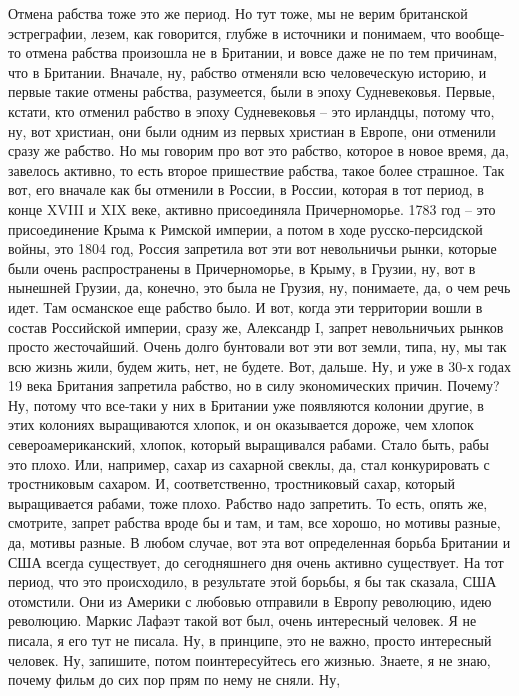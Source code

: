 Отмена рабства тоже это же период. Но тут тоже, мы не верим британской
эстреграфии, лезем, как говорится, глубже в источники и понимаем, что вообще-то
отмена рабства произошла не в Британии, и вовсе даже не по тем причинам, что в
Британии. Вначале, ну, рабство отменяли всю человеческую историю, и первые такие
отмены рабства, разумеется, были в эпоху Судневековья. Первые, кстати, кто
отменил рабство в эпоху Судневековья – это ирландцы, потому что, ну, вот
христиан, они были одним из первых христиан в Европе, они отменили сразу же
рабство. Но мы говорим про вот это рабство, которое в новое время, да, завелось
активно, то есть второе пришествие рабства, такое более страшное. Так вот, его
вначале как бы отменили в России, в России, которая в тот период, в конце XVIII
и XIX веке, активно присоединяла Причерноморье. 1783 год – это присоединение
Крыма к Римской империи, а потом в ходе русско-персидской войны, это 1804 год,
Россия запретила вот эти вот невольничьи рынки, которые были очень
распространены в Причерноморье, в Крыму, в Грузии, ну, вот в нынешней Грузии,
да, конечно, это была не Грузия, ну, понимаете, да, о чем речь идет. Там
османское еще рабство было. И вот, когда эти территории вошли в состав
Российской империи, сразу же, Александр I, запрет невольничьих рынков просто
жесточайший. Очень долго бунтовали вот эти вот земли, типа, ну, мы так всю жизнь
жили, будем жить, нет, не будете. Вот, дальше. Ну, и уже в 30-х годах 19 века
Британия запретила рабство, но в силу экономических причин. Почему? Ну, потому
что все-таки у них в Британии уже появляются колонии другие, в этих колониях
выращиваются хлопок, и он оказывается дороже, чем хлопок североамериканский,
хлопок, который выращивался рабами. Стало быть, рабы это плохо. Или, например,
сахар из сахарной свеклы, да, стал конкурировать с тростниковым сахаром. И,
соответственно, тростниковый сахар, который выращивается рабами, тоже плохо.
Рабство надо запретить. То есть, опять же, смотрите, запрет рабства вроде бы и
там, и там, все хорошо, но мотивы разные, да, мотивы разные. В любом случае, вот
эта вот определенная борьба Британии и США всегда существует, до сегодняшнего
дня очень активно существует. На тот период, что это происходило, в результате
этой борьбы, я бы так сказала, США отомстили. Они из Америки с любовью отправили
в Европу революцию, идею революцию. Маркис Лафаэт такой вот был, очень
интересный человек. Я не писала, я его тут не писала. Ну, в принципе, это не
важно, просто интересный человек. Ну, запишите, потом поинтересуйтесь его
жизнью. Знаете, я не знаю, почему фильм до сих пор прям по нему не сняли. Ну,
